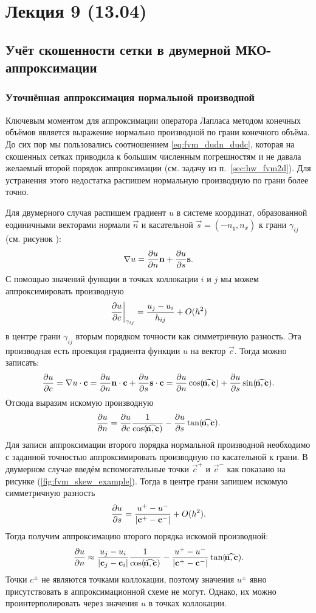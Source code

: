 \section{Лекция 9 (13.04)}

\subsection{Учёт скошенности сетки в двумерной МКО-аппроксимации}
\subsubsection{Уточнённая аппроксимация нормальной производной}
Ключевым моментом для аппроксимации оператора Лапласа
методом конечных объёмов является выражение нормально производной
по грани конечного объёма.
До сих пор мы пользовались соотношением \cref{eq:fvm_dudn_dudc},
которая на скошенных сетках приводила к большим численным погрешностям
и не давала желаемый второй порядок аппроксимации (см. задачу из п.~\ref{sec:hw_fvm2d}).
Для устранения этого недостатка распишем нормальную производную по грани более точно.

Для двумерного случая распишем градиент $u$ в системе координат,
образованной еодиничными векторами нормали $\vec n$ и касательной $\vec s = (-n_y, n_x)$
к грани $\gamma_{ij}$ (см. рисунок ):
$$
\nabla u = \frac{\partial u}{\partial n}\boldsymbol{\rm n} + \frac{\partial u}{\partial s} \boldsymbol{\rm s}.
$$
С помощью значений функции в точках коллокации $i$ и $j$
мы можем аппроксимировать производную
$$
\left.\frac{\partial u}{\partial c}\right|_{\gamma_{ij}} = \frac{u_j - u_i}{h_{ij}} + O(h^2)
$$
в центре грани $\gamma_{ij}$ вторым порядком точности как симметричную разность.
Эта производная есть проекция градиента функции $u$ на
вектор $\vec c$. Тогда можно записать:
$$
\dfr{u}{c} = \nabla u \cdot \vec c = \dfr{u}{n} \vec n \cdot \vec c + \dfr{u}{s} \vec s \cdot \vec c
 = \dfr{u}{n} \cos(\vecangle{n}{c}) + \dfr{u}{s} \sin(\vecangle{n}{c}).
$$
Отсюда выразим искомую производную
\begin{equation}
\label{eq:fvm_dudn_div}
\dfr{u}{n} = \dfr{u}{c} \frac{1}{\cos(\vecangle{n}{c})} - \dfr{u}{s} \tan(\vecangle{n}{c}).
\end{equation}
Для записи аппроксимации второго порядка нормальной производной
необходимо с заданной точностью аппроксимировать производную по касательной к грани.
В двумерном случае введём вспомогательные точки $\vec c^{+}$  и $\vec c^{-}$ как
показано на рисунке (\ref{fig:fvm_skew_example}). Тогда в центре грани запишем искомую симметричную разность
$$
\frac{\partial u}{\partial s} = \frac{u^{+} - u^{-}}{|\boldsymbol{\rm c}^+ - \boldsymbol{\rm c}^-|} + O(h^2).
$$
Тогда получим аппроксимацию второго порядка искомой производной:
\begin{equation}
\label{eq:fvm_dudn_upm}
\dfr{u}{n} \approx \frac{u_j - u_i}{|\vec c_j - \vec c_i|} \frac{1}{\cos(\vecangle{n}{c})} - \frac{u^{+} - u^{-}}{|\vec c^+ - \vec c^-|}  \tan(\vecangle{n}{c}).
\end{equation}
Точки $c^{\pm}$ не являются точками коллокации, поэтому значения $u^{\pm}$ явно
присутствовать в аппроксимационной схеме не могут. Однако, их можно проинтерполировать
через значения $u$ в точках коллокации.

